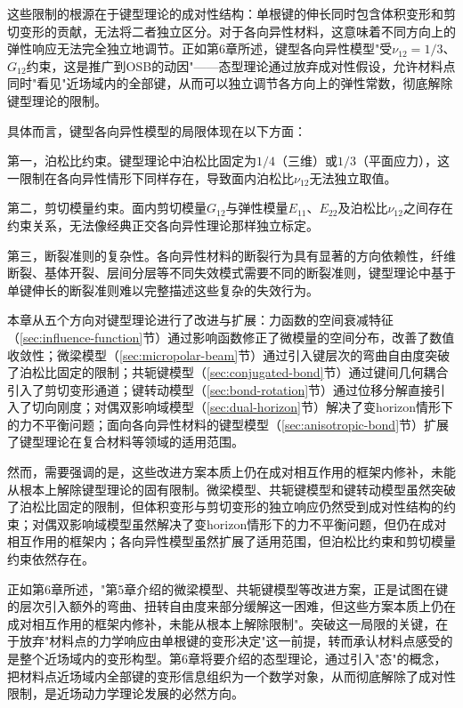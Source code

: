 这些限制的根源在于键型理论的成对性结构：单根键的伸长同时包含体积变形和剪切变形的贡献，无法将二者独立区分。对于各向异性材料，这意味着不同方向上的弹性响应无法完全独立地调节。正如第6章所述，键型各向异性模型"受$\nu_{12}=1/3$、$G_{12}$约束，这是推广到OSB的动因"——态型理论通过放弃成对性假设，允许材料点同时"看见"近场域内的全部键，从而可以独立调节各方向上的弹性常数，彻底解除键型理论的限制。

具体而言，键型各向异性模型的局限体现在以下方面：

第一，泊松比约束。键型理论中泊松比固定为$1/4$（三维）或$1/3$（平面应力），这一限制在各向异性情形下同样存在，导致面内泊松比$\nu_{12}$无法独立取值。

第二，剪切模量约束。面内剪切模量$G_{12}$与弹性模量$E_{11}$、$E_{22}$及泊松比$\nu_{12}$之间存在约束关系，无法像经典正交各向异性理论那样独立标定。

第三，断裂准则的复杂性。各向异性材料的断裂行为具有显著的方向依赖性，纤维断裂、基体开裂、层间分层等不同失效模式需要不同的断裂准则，键型理论中基于单键伸长的断裂准则难以完整描述这些复杂的失效行为。


本章从五个方向对键型理论进行了改进与扩展：力函数的空间衰减特征（\ref{sec:influence-function}节）通过影响函数修正了微模量的空间分布，改善了数值收敛性；微梁模型（\ref{sec:micropolar-beam}节）通过引入键层次的弯曲自由度突破了泊松比固定的限制；共轭键模型（\ref{sec:conjugated-bond}节）通过键间几何耦合引入了剪切变形通道；键转动模型（\ref{sec:bond-rotation}节）通过位移分解直接引入了切向刚度；对偶双影响域模型（\ref{sec:dual-horizon}节）解决了变horizon情形下的力不平衡问题；面向各向异性材料的键型模型（\ref{sec:anisotropic-bond}节）扩展了键型理论在复合材料等领域的适用范围。

然而，需要强调的是，这些改进方案本质上仍在成对相互作用的框架内修补，未能从根本上解除键型理论的固有限制。微梁模型、共轭键模型和键转动模型虽然突破了泊松比固定的限制，但体积变形与剪切变形的独立响应仍然受到成对性结构的约束；对偶双影响域模型虽然解决了变horizon情形下的力不平衡问题，但仍在成对相互作用的框架内；各向异性模型虽然扩展了适用范围，但泊松比约束和剪切模量约束依然存在。

正如第6章所述，"第5章介绍的微梁模型、共轭键模型等改进方案，正是试图在键的层次引入额外的弯曲、扭转自由度来部分缓解这一困难，但这些方案本质上仍在成对相互作用的框架内修补，未能从根本上解除限制"。突破这一局限的关键，在于放弃"材料点的力学响应由单根键的变形决定"这一前提，转而承认材料点感受的是整个近场域内的变形构型。第6章将要介绍的态型理论，通过引入"态"的概念，把材料点近场域内全部键的变形信息组织为一个数学对象，从而彻底解除了成对性限制，是近场动力学理论发展的必然方向。
